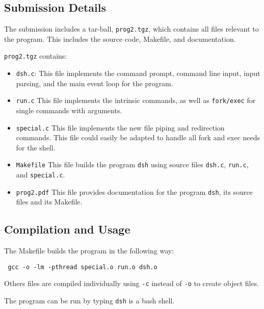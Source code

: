 \documentclass[11pt,a4paper]{article}
\newcommand{\nl}{\vspace{10pt}}
\begin{document}
\subsection*{Submission Details}

The submission includes a tar-ball, \texttt{prog2.tgz}, which contains all files relevant to the program. This includes the source code, Makefile, and documentation.\nl

\texttt{prog2.tgz} contains: 
\begin{itemize}

\item \texttt{dsh.c}: This file implements the command prompt, command line input, input parsing, and the main event loop for the program.

\item \texttt{run.c} This file implements the intrinsic commands, as well as \texttt{fork/exec} for single commands with arguments.

\item \texttt{special.c} This file implements the new file piping and redirection commands. This file could easily be adapted to handle all fork and exec needs for the shell.

\item \texttt{Makefile} This file builds the program \texttt{dsh} using source files \texttt{dsh.c}, \texttt{run.c}, and \texttt{special.c}.

\item \texttt{prog2.pdf} This file provides documentation for the program \texttt{dsh}, its source files and its Makefile.

\end{itemize}

\subsection*{Compilation and Usage}

The Makefile builds the program in the following way:

\begin{description}
\item \texttt{ gcc -o -lm -pthread special.o run.o dsh.o }
\item Others files are compiled individually using \texttt{-c} instead of \texttt{-o} to create object files.
\end{description}

The program can be run by typing \texttt{dsh} is a bash shell.
\end{document}
